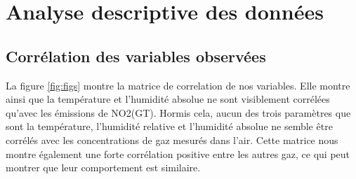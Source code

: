 \documentclass[
]{article}
\newenvironment{Shaded}{\begin{snugshade}}{\end{snugshade}}
\newcommand{\AttributeTok}[1]{\textcolor[rgb]{0.77,0.63,0.00}{#1}}
\newcommand{\FunctionTok}[1]{\textcolor[rgb]{0.00,0.00,0.00}{#1}}
\newcommand{\NormalTok}[1]{#1}
\newcommand{\OtherTok}[1]{\textcolor[rgb]{0.56,0.35,0.01}{#1}}
\newcommand{\SpecialCharTok}[1]{\textcolor[rgb]{0.00,0.00,0.00}{#1}}
\newcommand{\StringTok}[1]{\textcolor[rgb]{0.31,0.60,0.02}{#1}}
\begin{document}
\begin{Shaded}
\end{Shaded}

\hypertarget{analyse-descriptive-des-donnuxe9es}{%
\section{Analyse descriptive des
données}\label{analyse-descriptive-des-donnuxe9es}}

\hypertarget{corruxe9lation-des-variables-observuxe9es}{%
\subsection{Corrélation des variables
observées}\label{corruxe9lation-des-variables-observuxe9es}}

La figure \ref{fig:figs} montre la matrice de correlation de nos
variables. Elle montre ainsi que la température et l'humidité absolue ne
sont visiblement corrélées qu'avec les émissions de NO2(GT). Hormis
cela, aucun des trois paramètres que sont la température, l'humidité
relative et l'humidité absolue ne semble être corrélés avec les
concentrations de gaz mesurés dans l'air. Cette matrice nous montre
également une forte corrélation positive entre les autres gaz, ce qui
peut montrer que leur comportement est similaire.
\end{document}
